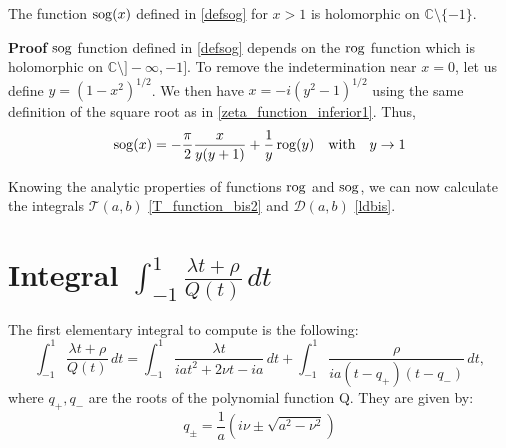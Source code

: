 \begin{lemma}
\label{lemma_sog}
The function ${\rm sog}(x)$ defined in \eqref{defsog} for $x>1$ is holomorphic on $\mathbb{C}\setminus \{-1\}$.
\end{lemma}


{\bf Proof}
${\rm sog}$ function defined in \eqref{defsog} depends on the $\rm rog$ function which is holomorphic on $\mathbb{C}\setminus \rbrack - \infty, -1 \rbrack$. To remove the indetermination near $x=0$, let us define $y=\left( 1-x^2 \right)^{1/2}$. We then have $x = -i \left( y^2 -1 \right)^{1/2} $ using the same definition of the square root as in \eqref{zeta_function_inferior1}. Thus,
\begin{equation}
{\rm sog}(x) = - \dfrac{\pi}{2} \dfrac{x}{y(y+1)} + \dfrac{1}{y} \, {\rm rog}(y) \quad \text{with} \quad y \rightarrow  1
\end{equation}

Knowing the analytic properties of functions $\rm rog$ and ${\rm sog}$, we can now calculate the integrals $\mathcal{T}(a,b)$ \eqref{T_function_bis2} and $\mathcal{D}(a,b)$ \eqref{ldbis}.

\section{Integral $\int_{-1}^1 \frac{\lambda t+ \rho}{Q(t)}\, dt$}
\label{calculIntQ}
The first elementary integral to compute is the following:
\begin{equation*}
\int_{-1}^1 \frac{\lambda t+ \rho}{Q(t)}\, dt=\int_{-1}^1 \frac{\lambda t}{iat^2+2\nu t-ia}\,dt+\int_{-1}^1\frac{\rho}{ia(t-q_+)(t-q_-)}\,dt,
\end{equation*}
where $q_+,q_-$ are the roots of the polynomial function Q. They are given by:
\begin{equation}
q_\pm=\frac{1}{a}(i\nu\pm\sqrt{a^2-\nu^2})
\label{q1q2}
\end{equation}

